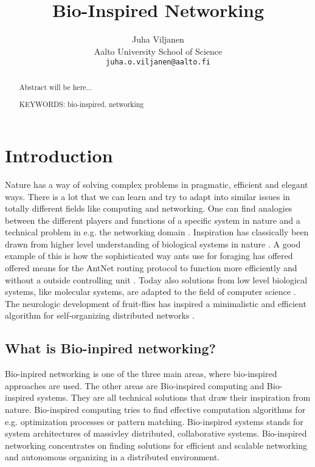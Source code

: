 \documentclass{IWORK2014}
\begin{document}

\title{Bio-Inspired Networking}

\author{Juha Viljanen\\
        Aalto University School of Science \\
	\texttt{juha.o.viljanen@aalto.fi}}
\maketitle


\begin{abstract}
  Abstract will be here...

\vspace{3mm}
\noindent KEYWORDS: bio-inspired, networking

\end{abstract}



\section{Introduction}

Nature has a way of solving complex problems in pragmatic, efficient and elegant ways. There is a lot that we can learn and try to adapt into similar issues in totally different fields like computing and networking. One can find analogies between the different players and functions of a specific system in nature and a technical problem in e.g. the networking domain \cite{dressler2010bio}. Inspiration has classically been drawn from higher level understanding of biological systems in nature \cite{kroeker2011biology}. A good example of this is how the sophisticated way ants use for foraging has offered offered means for the AntNet routing protocol to function more efficiently and without a outside controlling unit \cite{dressler2010bio}. Today also solutions from low level biological systems, like molecular systems, are adapted to the field of computer science \cite{kroeker2011biology}. The neurologic development of fruit-flies has inspired a minimalistic and efficient algorithm for self-organizing distributed networks \cite{kroeker2011biology}.

\subsection{What is Bio-inpired networking?}
Bio-inpired networking is one of the three main areas, where bio-inspired approaches are used. The other areas are Bio-inspired computing and Bio-inspired systems. They are all technical solutions that draw their inspiration from nature. Bio-inspired computing tries to find effective computation algorithms for e.g. optimization processes or pattern matching. Bio-inspired systems stands for system architectures of massivley distributed, collaborative systems. Bio-inspired networking concentrates on finding solutions for efficient and scalable networking and autonomous organizing in a distributed environment. \cite{dressler2010bio}
\end{document}
